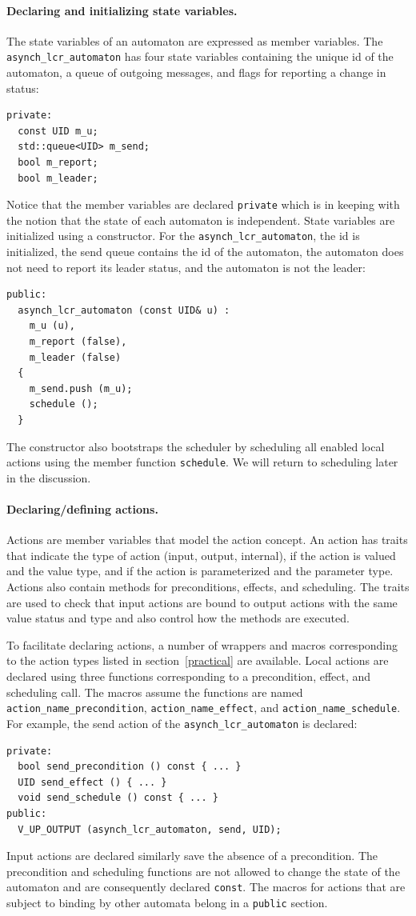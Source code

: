 \paragraph{Declaring and initializing state variables.}
The state variables of an automaton are expressed as member variables.
The \verb+asynch_lcr_automaton+ has four state variables containing the unique id of the automaton, a queue of outgoing messages, and flags for reporting a change in status:
\begin{lstlisting}
private:
  const UID m_u;
  std::queue<UID> m_send;
  bool m_report;
  bool m_leader;
\end{lstlisting}
Notice that the member variables are declared \verb+private+ which is in keeping with the notion that the state of each automaton is independent.
State variables are initialized using a constructor.
For the \verb+asynch_lcr_automaton+, the id is initialized, the send queue contains the id of the automaton, the automaton does not need to report its leader status, and the automaton is not the leader:
\begin{lstlisting}
public:
  asynch_lcr_automaton (const UID& u) :
    m_u (u),
    m_report (false),
    m_leader (false)
  {
    m_send.push (m_u);
    schedule ();
  }
\end{lstlisting}
The constructor also bootstraps the scheduler by scheduling all enabled local actions using the member function \verb+schedule+.
We will return to scheduling later in the discussion.

\paragraph{Declaring/defining actions.}
Actions are member variables that model the action concept.
An action has traits that indicate the type of action (input, output, internal), if the action is valued and the value type, and if the action is parameterized and the parameter type.
Actions also contain methods for preconditions, effects, and scheduling.
The traits are used to check that input actions are bound to output actions with the same value status and type and also control how the methods are executed.

To facilitate declaring actions, a number of wrappers and macros corresponding to the action types listed in section~\ref{practical} are available.
Local actions are declared using three functions corresponding to a precondition, effect, and scheduling call.
The macros assume the functions are named \verb+action_name_precondition+, \verb+action_name_effect+, and \verb+action_name_schedule+.
For example, the send action of the \verb+asynch_lcr_automaton+ is declared:
\begin{lstlisting}
private:
  bool send_precondition () const { ... }
  UID send_effect () { ... }
  void send_schedule () const { ... }
public:
  V_UP_OUTPUT (asynch_lcr_automaton, send, UID);
\end{lstlisting}
Input actions are declared similarly save the absence of a precondition.
The precondition and scheduling functions are not allowed to change the state of the automaton and are consequently declared \verb+const+.
The macros for actions that are subject to binding by other automata belong in a \verb+public+ section.

